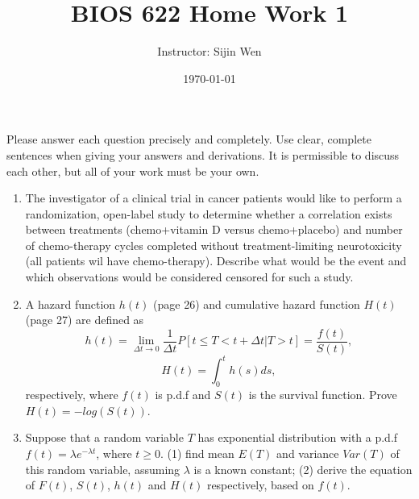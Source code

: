 
\setlength{\oddsidemargin}{0.01in}
\setlength{\textwidth}{6.5in}
\setlength{\topmargin}{-0.51in}
\setlength{\textheight}{8.5in}


\def\bebf{\mbox{\boldmath $\beta$}}
\def\mubf{\mbox{\boldmath $\mu$}}
\def\epbf{\mbox{\scriptsize\boldmath $\epsilon$}}
\def\mus{\mbox{\scriptsize\boldmath $\mu$}}


\title{BIOS 622 Home Work 1}
\vspace{0.2in}
\author{Instructor: Sijin Wen\\ }
\date{\today}
\maketitle

\baselineskip=18pt
\parskip 12pt

Please answer each question precisely and completely. Use clear, complete sentences when giving your answers and derivations.  It is permissible to discuss each other, but all of your work must be your own.  

\begin{enumerate}

\item The investigator of a clinical trial in cancer patients would like to perform a randomization, open-label study to determine whether a correlation exists between treatments (chemo+vitamin D versus chemo+placebo) and number of chemo-therapy cycles completed without treatment-limiting neurotoxicity (all patients wil have chemo-therapy). Describe what would be the event and which observations would be considered censored for such a study.



\item A hazard function $h(t)$ (page 26) and cumulative hazard function $H(t)$ (page 27) are defined as
$$
h(t) = \lim_{\Delta t \to 0} \frac{1}{\Delta t} P[t \leq T < t +\Delta t | T > t] = \frac{f(t)}{S(t)},
$$
$$
H(t) = \int_0^t h(s)ds,
$$
respectively, where $f(t)$ is p.d.f and $S(t)$ is the survival function. Prove $H(t) = - log(S(t))$.


\item Suppose that a random variable $T$ has exponential distribution with a p.d.f $f(t) = \lambda e^{-\lambda t}$, where $t \ge 0$. (1) find mean $E(T)$ and variance $Var(T)$ of this random variable, assuming $\lambda$ is a known constant; (2) derive the equation of $F(t)$, $S(t)$, $h(t)$ and $H(t)$ respectively, based on $f(t)$.




\end{enumerate}









